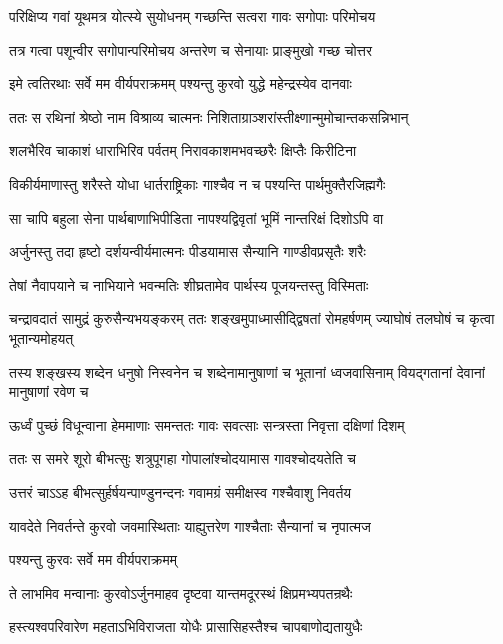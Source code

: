 \twolineshloka
{परिक्षिप्य गवां यूथमत्र योत्स्ये सुयोधनम्}
{गच्छन्ति सत्वरा गावः सगोपाः परिमोचय}


\twolineshloka
{तत्र गत्वा पशून्वीर सगोपान्परिमोचय}
{अन्तरेण च सेनायाः प्राङ्मुखो गच्छ चोत्तर}


\twolineshloka
{इमे त्वतिरथाः सर्वे मम वीर्यपराक्रमम्}
{पश्यन्तु कुरवो युद्धे महेन्द्रस्येव दानवाः}



\twolineshloka
{ततः स रथिनां श्रेष्ठो नाम विश्राव्य चात्मनः}
{निशिताग्राञ्शरांस्तीक्ष्णान्मुमोचान्तकसन्निभान्}


\twolineshloka
{शलभैरिव चाकाशं धाराभिरिव पर्वतम्}
{निरावकाशमभवच्छरैः क्षिप्तैः किरीटिना}


\twolineshloka
{विकीर्यमाणास्तु शरैस्ते योधा धार्तराष्ट्रिकाः}
{गाश्चैव न च पश्यन्ति पार्थमुक्तैरजिह्मगैः}


\twolineshloka
{सा चापि बहुला सेना पार्थबाणाभिपीडिता}
{नापश्यद्विवृतां भूमिं नान्तरिक्षं दिशोऽपि वा}


\twolineshloka
{अर्जुनस्तु तदा हृष्टो दर्शयन्वीर्यमात्मनः}
{पीडयामास सैन्यानि गाण्डीवप्रसृतैः शरैः}


\twolineshloka
{तेषां नैवापयाने च नाभियाने भवन्मतिः}
{शीघ्रतामेव पार्थस्य पूजयन्तस्तु विस्मिताः}


\threelineshloka
{चन्द्रावदातं सामुद्रं कुरुसैन्यभयङ्करम्}
{ततः शङ्खमुपाध्मासीद्द्विषतां रोमहर्षणम्}
{ज्याघोषं तलघोषं च कृत्वा भूतान्यमोहयत्}


\threelineshloka
{तस्य शङ्खस्य शब्देन धनुषो निस्वनेन च}
{शब्देनामानुषाणां च भूतानां ध्वजवासिनाम्}
{वियद्गतानां देवानां मानुषाणां रवेण च}


\twolineshloka
{ऊर्ध्वं पुच्छं विधून्वाना हेममाणाः समन्ततः}
{गावः सवत्साः सन्त्रस्ता निवृत्ता दक्षिणां दिशम्}


\twolineshloka
{ततः स समरे शूरो बीभत्सुः शत्रुपूगहा}
{गोपालांश्चोदयामास गावश्चोदयतेति च}


\twolineshloka
{उत्तरं चाऽऽह बीभत्सुर्हर्षयन्पाण्डुनन्दनः}
{गवामग्रं समीक्षस्व गश्चैवाशु निवर्तय}


\twolineshloka
{यावदेते निवर्तन्ते कुरवो जवमास्थिताः}
{याह्युत्तरेण गाश्चैताः सैन्यानां च नृपात्मज}


\onelineshloka
{पश्यन्तु कुरवः सर्वे मम वीर्यपराक्रमम्}



\twolineshloka
{ते लाभमिव मन्वानाः कुरवोऽर्जुनमाहव}
{दृष्टवा यान्तमदूरस्थं क्षिप्रमभ्यपतन्रथैः}


\twolineshloka
{हस्त्यश्वपरिवारेण महताऽभिविराजता}
{योधैः प्रासासिहस्तैश्च चापबाणोद्यतायुधैः}


